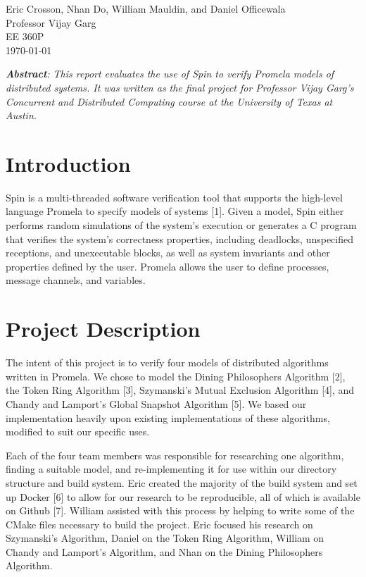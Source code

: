\documentclass[12pt]{article}
\begin{document}
\begin{flushleft}
Eric Crosson, Nhan Do, William Mauldin, and Daniel Officewala \\
Professor Vijay Garg\\
EE 360P \\
\today \\

\begin{center}
\emph{\textbf{Abstract}: This report evaluates the use of Spin to verify Promela models of distributed systems. It was written as the final project for Professor Vijay Garg's Concurrent and Distributed Computing course at the University of Texas at Austin.}
\end{center}

\setlength{\parindent}{0.5in}
\section{Introduction}
Spin is a multi-threaded software verification tool that supports the high-level language Promela to specify models of systems [1]. Given a model, Spin either performs random simulations of the system's execution or generates a C program that verifies the system's correctness properties, including deadlocks, unspecified receptions, and unexecutable blocks, as well as system invariants and other properties defined by the user. Promela allows the user to define processes, message channels, and variables.

\section{Project Description}
The intent of this project is to verify four models of distributed algorithms written in Promela. We chose to model the Dining Philosophers Algorithm [2], the Token Ring Algorithm [3], Szymanski's Mutual Exclusion Algorithm [4], and Chandy and Lamport's Global Snapshot Algorithm [5]. We based our implementation heavily upon existing implementations of these algorithms, modified to suit our specific uses.

Each of the four team members was responsible for researching one algorithm, finding a suitable model, and re-implementing it for use within our directory structure and build system. Eric created the majority of the build system and set up Docker [6] to allow for our research to be reproducible, all of which is available on Github [7]. William assisted with this process by helping to write some of the CMake files necessary to build the project. Eric focused his research on Szymanski's Algorithm, Daniel on the Token Ring Algorithm, William on Chandy and Lamport's Algorithm, and Nhan on the Dining Philosophers Algorithm.


\end{flushleft}
\end{document}
